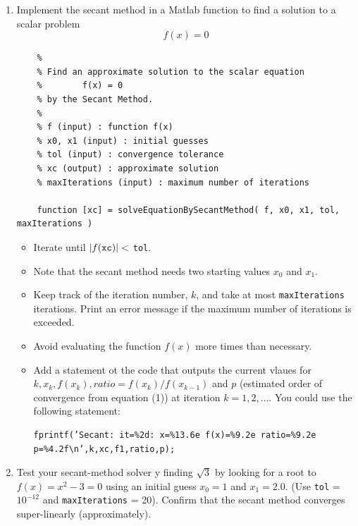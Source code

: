 \documentclass[10pt,letterpaper]{article}
\begin{document}
\begin{enumerate}

\item Implement the secant method in a Matlab function to find a solution to a scalar problem
$$f(x) = 0$$

\begin{verbatim}
	%
	% Find an approximate solution to the scalar equation
	%        f(x) = 0
	% by the Secant Method.
	%
	% f (input) : function f(x)
	% x0, x1 (input) : initial guesses
	% tol (input) : convergence tolerance
	% xc (output) : approximate solution
	% maxIterations (input) : maximum number of iterations
	
	function [xc] = solveEquationBySecantMethod( f, x0, x1, tol, maxIterations )
\end{verbatim}

\begin{itemize}

\item Iterate until $|f({\tt xc})| <$ {\tt tol}.

\item Note that the secant method needs two starting values $x_{0}$ and $x_{1}$. 

\item Keep track of the iteration number, $k$, and take at most {\tt maxIterations} iterations. Print an error message if the maximum number of iterations is exceeded.

\item Avoid evaluating the function $f(x)$ more times than necessary.

\item Add a statement ot the code that outputs the current vlaues for $k, x_{k}, f(x_{k}), ratio = f(x_{k})/f(x_{k - 1})$ and $p$ (estimated order of convergence from equation (1)) at iteration $k = 1, 2, \dots$. You could use the following statement:
\begin{verbatim}
fprintf(’Secant: it=%2d: x=%13.6e f(x)=%9.2e ratio=%9.2e p=%4.2f\n’,k,xc,f1,ratio,p);
\end{verbatim}

\end{itemize}

\item Test your secant-method solver y finding $\sqrt{3}$ by looking for a root to $f(x) = x^{2} - 3 = 0$ using an initial guess $x_{0} = 1$ and $x_{1} = 2.0$. (Use {\tt tol} = $10^{-12}$ and {\tt maxIterations} = 20). Confirm that the secant method converges super-linearly (approximately).


\end{enumerate}
\end{document}
